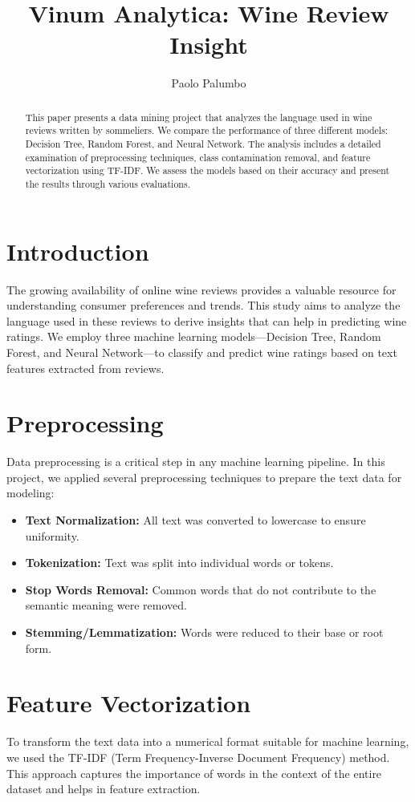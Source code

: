\documentclass[twocolumn]{article}
\title{Vinum Analytica: Wine Review Insight}
\author{Paolo Palumbo}
\date{}
\begin{document}
\maketitle

\begin{abstract}
    This paper presents a data mining project that analyzes the language used in wine reviews written by sommeliers. We compare the performance of three different models: Decision Tree, Random Forest, and Neural Network. The analysis includes a detailed examination of preprocessing techniques, class contamination removal, and feature vectorization using TF-IDF. We assess the models based on their accuracy and present the results through various evaluations.
\end{abstract}

\section{Introduction}
The growing availability of online wine reviews provides a valuable resource for understanding consumer preferences and trends. This study aims to analyze the language used in these reviews to derive insights that can help in predicting wine ratings. We employ three machine learning models—Decision Tree, Random Forest, and Neural Network—to classify and predict wine ratings based on text features extracted from reviews.

\section{Preprocessing}
Data preprocessing is a critical step in any machine learning pipeline. In this project, we applied several preprocessing techniques to prepare the text data for modeling:

\begin{itemize}
    \item \textbf{Text Normalization:} All text was converted to lowercase to ensure uniformity.
    \item \textbf{Tokenization:} Text was split into individual words or tokens.
    \item \textbf{Stop Words Removal:} Common words that do not contribute to the semantic meaning were removed.
    \item \textbf{Stemming/Lemmatization:} Words were reduced to their base or root form.
\end{itemize}

\section{Feature Vectorization}
To transform the text data into a numerical format suitable for machine learning, we used the TF-IDF (Term Frequency-Inverse Document Frequency) method. This approach captures the importance of words in the context of the entire dataset and helps in feature extraction.
\end{document}
